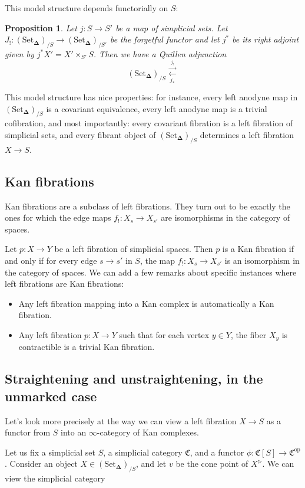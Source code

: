 \documentclass[12pt]{amsart}
\newcommand{\8}{\ensuremath{\infty}}
\newcommand{\C}{\ensuremath{\mathfrak{C}}}
\newcommand{\SSet}{\ensuremath{\text{Set}_{\boldsymbol{\Delta}}}}
\newcommand{\op}[1]{\ensuremath{{#1}^{\text{op}}}}
\newcommand{\adj}[2]{\ensuremath{\overset{\overset{#1}{ \rightarrow}}{\underset{#2}{\leftarrow}}}}
\newtheorem{proposition}{Proposition}
\begin{document}
This model structure depends functorially on $S$:
\begin{proposition}
  Let $j: S \rightarrow S'$ be a map of simplicial sets. Let $J_!: (\SSet)_{/S} \rightarrow (\SSet)_{/S'}$ be the forgetful functor and let $j^*$ be its right adjoint given by $j^*X' = X'\times_{S'} S$. Then we have a Quillen adjunction
  $$
    (\SSet)_{/S} \adj{j_!}{j_*}
  $$
\end{proposition}

This model structure has nice properties: for instance, every left anodyne map in $(\SSet)_{/S}$ is a covariant equivalence, every left anodyne map is a trivial cofibration, and most importantly: every covariant fibration is a left fibration of simplicial sets, and every fibrant object of $(\SSet)_{/S}$ determines a left fibration $X \rightarrow S$.

\subsection{Kan fibrations}
Kan fibrations are a subclass of left fibrations. They turn out to be exactly the ones for which the edge maps $f_!: X_s \rightarrow X_{s'}$ are isomorphisms in the category of spaces.

Let $p: X \rightarrow Y$ be a left fibration of simplicial spaces. Then $p$ is a Kan fibration if and only if for every edge $s \rightarrow s'$ in $S$, the map $f_!: X_s \rightarrow X_{s'}$ is an isomorphism in the category of spaces.
We can add a few remarks about specific instances where left fibrations are Kan fibrations:
\begin{itemize}
  \item Any left fibration mapping into a Kan complex is automatically a Kan fibration.
  \item Any left fibration $p: X \rightarrow Y$ such that for each vertex $y\in Y$, the fiber $X_y$ is contractible is a trivial Kan fibration.
\end{itemize}


\subsection{Straightening and unstraightening, in the unmarked case}

Let's look more precisely at the way we can view a left fibration $X \rightarrow S$ as a functor from $S$ into an $\8$-category of Kan complexes.

Let us fix a simplicial set $S$, a simplicial category $\C$, and a functor $\phi: \mathfrak{C}[S] \rightarrow \op\C$. Consider an object $X \in (\SSet)_{/S}$, and let $v$ be the cone point of $X^{\triangleright}$. We can view the simplicial category
\end{document}
